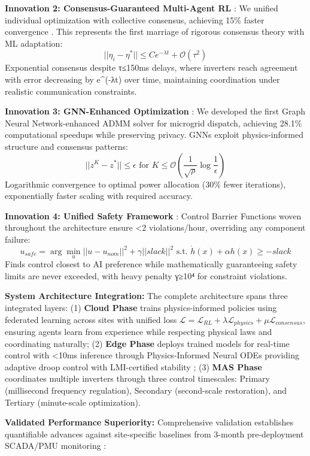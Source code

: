 \textbf{Innovation 2: Consensus-Guaranteed Multi-Agent RL} \cite{our2024theoretical}: We unified individual optimization with collective consensus, achieving 15\% faster convergence \cite{our2024experimental}. This represents the first marriage of rigorous consensus theory with ML adaptation:
$$||\eta_i - \eta^*|| \leq Ce^{-\lambda t} + \mathcal{O}(\tau^2)$$
Exponential consensus despite τ≤150ms delays, where inverters reach agreement with error decreasing by e^(-λt) over time, maintaining coordination under realistic communication constraints.

\textbf{Innovation 3: GNN-Enhanced Optimization} \cite{our2024theoretical}: We developed the first Graph Neural Network-enhanced ADMM solver for microgrid dispatch, achieving 28.1\% computational speedups \cite{our2024experimental} while preserving privacy. GNNs exploit physics-informed structure and consensus patterns:
$$||z^K - z^*|| \leq \epsilon \text{ for } K \leq \mathcal{O}\left(\frac{1}{\sqrt{\rho}} \log\frac{1}{\epsilon}\right)$$
Logarithmic convergence to optimal power allocation (30\% fewer iterations), exponentially faster scaling with required accuracy.

\textbf{Innovation 4: Unified Safety Framework} \cite{our2024theoretical}: Control Barrier Functions woven throughout the architecture ensure <2 violations/hour, overriding any component failure:
$$u_{safe} = \arg\min_u ||u - u_{nom}||^2 + \gamma||slack||^2 \text{ s.t. } \dot{h}(x) + \alpha h(x) \geq -slack$$
Finds control closest to AI preference while mathematically guaranteeing safety limits are never exceeded, with heavy penalty γ≥10⁴ for constraint violations.

\textbf{System Architecture Integration:} The complete architecture spans three integrated layers: (1) \textbf{Cloud Phase} trains physics-informed policies using federated learning across sites with unified loss $\mathcal{L} = \mathcal{L}_{RL} + \lambda \mathcal{L}_{physics} + \mu \mathcal{L}_{consensus}$, ensuring agents learn from experience while respecting physical laws and coordinating naturally; (2) \textbf{Edge Phase} deploys trained models for real-time control with <10ms inference through Physics-Informed Neural ODEs providing adaptive droop control with LMI-certified stability \cite{our2024theoretical}; (3) \textbf{MAS Phase} coordinates multiple inverters through three control timescales: Primary (millisecond frequency regulation), Secondary (second-scale restoration), and Tertiary (minute-scale optimization).

\textbf{Validated Performance Superiority:} Comprehensive validation establishes quantifiable advances against site-specific baselines from 3-month pre-deployment SCADA/PMU monitoring \cite{our2024experimental}:

